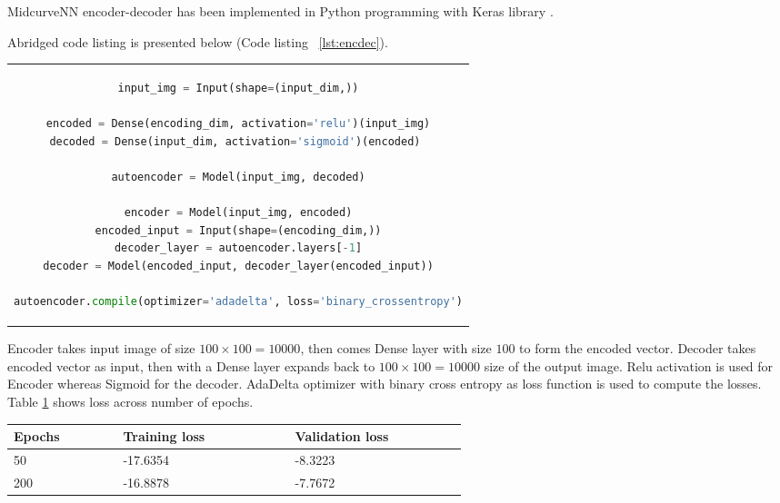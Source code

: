 \documentclass[9pt,academicons]{article}
\begin{document}
MidcurveNN encoder-decoder has been implemented in Python programming with Keras library \cite{autoenkeras}.  

Abridged code listing is presented below (Code listing ~\ref{lst:encdec}).

\begin{center}
\begin{tabular}{c}
\begin{lstlisting}[language=Python, caption=Encoder-Decoder,label={lst:encdec},frame=single]
input_img = Input(shape=(input_dim,))
    
encoded = Dense(encoding_dim, activation='relu')(input_img)
decoded = Dense(input_dim, activation='sigmoid')(encoded) 
    
autoencoder = Model(input_img, decoded)
            
encoder = Model(input_img, encoded)
encoded_input = Input(shape=(encoding_dim,))
decoder_layer = autoencoder.layers[-1]
decoder = Model(encoded_input, decoder_layer(encoded_input))
    
autoencoder.compile(optimizer='adadelta', loss='binary_crossentropy')
\end{lstlisting}	
\end{tabular}
\end{center}

Encoder takes input image of size $100 \times 100 = 10000$, then comes Dense layer with size $100$ to form the encoded vector. Decoder takes encoded vector as input, then with a Dense layer expands back to $100 \times 100 = 10000$ size of the output image. Relu activation is used for Encoder whereas Sigmoid for the decoder. AdaDelta optimizer with binary cross entropy as loss function is used to compute the losses. Table \ref{tbl_loss} shows loss across number of epochs.    


\begin{table}[h]
\centering

\begin{tabular}[htbp]{@{} p{0.14\linewidth}  p{0.22\linewidth}  p{0.22\linewidth}  @{}} \toprule
{\bf Epochs } & {\bf Training loss }  & {\bf Validation loss} \\
\midrule
50	& -17.6354	& -8.3223\\
200	& -16.8878	& -7.7672 \\
\bottomrule
\end{tabular}
\label{tbl_loss}
\end{table}
\end{document}
